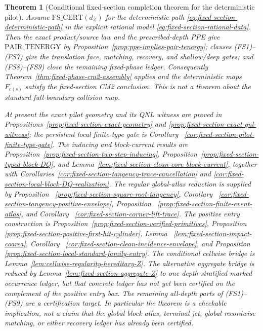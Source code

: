 \documentclass[11pt]{article}
\newtheorem{theorem}{Theorem}[section]
\begin{document}
\begin{theorem}[Conditional fixed-section completion theorem for the deterministic pilot]
\label{thm:fixed-section-nonvacuity-certificate}
Assume $\mathrm{FS\_CERT}(d_Z)$ for the deterministic path
\eqref{eq:fixed-section-deterministic-path} in the explicit rational model
\eqref{eq:fixed-section-rational-data}.  Then the exact product/source law
and the prescribed-depth PPE give $\mathrm{PAIR\_TENERGY}$ by
Proposition~\ref{prop:ppe-implies-pair-tenergy}; clauses
\textup{(FS1)--(FS7)} give the translation face, matching, recovery, and
shallow/deep gates; and \textup{(FS8)--(FS9)} close the remaining fixed-phase
ledger.  Consequently Theorem~\ref{thm:fixed-phase-cm2-assembly} applies and
the deterministic maps $F_{c(s)}$ satisfy the fixed-section CM2 conclusion.
This is not a theorem about the standard full-boundary collision map.

At present the exact pilot geometry and its QNL witness are proved in
Propositions~\ref{prop:fixed-section-exact-geometry} and
\ref{prop:fixed-section-exact-qnl-witness}; the persistent local
finite-type gate is Corollary~
\ref{cor:fixed-section-pilot-finite-type-gate}.  The inducing and block-current
results are Proposition~\ref{prop:fixed-section-two-step-inducing},
Proposition~\ref{prop:fixed-section-typed-block-DQ}, and
Lemma~\ref{lem:fixed-section-clean-core-block-current}, together with
Corollaries~\ref{cor:fixed-section-tangency-trace-cancellation} and
\ref{cor:fixed-section-local-block-DQ-realization}.  The regular global-atlas
reduction is supplied by Proposition~
\ref{prop:fixed-section-square-root-tangency}, Corollary~
\ref{cor:fixed-section-tangency-positive-envelope}, Proposition~
\ref{prop:fixed-section-finite-event-atlas}, and Corollary~
\ref{cor:fixed-section-corner-lift-trace}.  The positive entry construction
is Proposition~\ref{prop:fixed-section-verified-primitives}, Proposition~
\ref{prop:fixed-section-positive-first-hit-cylinder}, Lemma~
\ref{lem:fixed-section-impact-coarea}, Corollary~
\ref{cor:fixed-section-clean-incidence-envelope}, and Proposition~
\ref{prop:fixed-section-local-standard-family-entry}.  The conditional
cellwise bridge is Lemma~\ref{lem:cellwise-regularity-hereditary-Z}.  The alternative
aggregate bridge is reduced by
Lemma~\ref{lem:fixed-section-aggregate-Z} to one depth-stratified marked
occurrence ledger, but that concrete ledger has not yet been certified on
the complement of the positive entry box.  The remaining
all-depth parts of \textup{(FS1)--(FS9)} are a certification target.  In
particular the theorem is a checkable implication, not a claim that the
global block atlas, terminal jet, global recordwise matching, or either
recovery ledger has already been certified.
\end{theorem}
\end{document}
